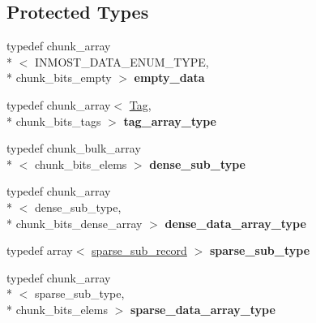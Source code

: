 \subsection*{Protected Types}
\begin{DoxyCompactItemize}
\item 
\hypertarget{classINMOST_1_1TagManager_a6c89e8450f65055147301406d7f9c437}{typedef chunk\-\_\-array\\*
$<$ I\-N\-M\-O\-S\-T\-\_\-\-D\-A\-T\-A\-\_\-\-E\-N\-U\-M\-\_\-\-T\-Y\-P\-E, \\*
chunk\-\_\-bits\-\_\-empty $>$ {\bfseries empty\-\_\-data}}\label{classINMOST_1_1TagManager_a6c89e8450f65055147301406d7f9c437}

\item 
\hypertarget{classINMOST_1_1TagManager_ab7915f5a3e87fe36e14e9766d1437369}{typedef chunk\-\_\-array$<$ \hyperlink{classINMOST_1_1Tag}{Tag}, \\*
chunk\-\_\-bits\-\_\-tags $>$ {\bfseries tag\-\_\-array\-\_\-type}}\label{classINMOST_1_1TagManager_ab7915f5a3e87fe36e14e9766d1437369}

\item 
\hypertarget{classINMOST_1_1TagManager_acc5a035bf2ee39c0fb8417b0b290a26b}{typedef chunk\-\_\-bulk\-\_\-array\\*
$<$ chunk\-\_\-bits\-\_\-elems $>$ {\bfseries dense\-\_\-sub\-\_\-type}}\label{classINMOST_1_1TagManager_acc5a035bf2ee39c0fb8417b0b290a26b}

\item 
\hypertarget{classINMOST_1_1TagManager_ac573af6facd80a651b3496938235130e}{typedef chunk\-\_\-array\\*
$<$ dense\-\_\-sub\-\_\-type, \\*
chunk\-\_\-bits\-\_\-dense\-\_\-array $>$ {\bfseries dense\-\_\-data\-\_\-array\-\_\-type}}\label{classINMOST_1_1TagManager_ac573af6facd80a651b3496938235130e}

\item 
\hypertarget{classINMOST_1_1TagManager_a580e8cfe488c581a007d7108a27d5718}{typedef array$<$ \hyperlink{structINMOST_1_1TagManager_1_1sparse__sub__record}{sparse\-\_\-sub\-\_\-record} $>$ {\bfseries sparse\-\_\-sub\-\_\-type}}\label{classINMOST_1_1TagManager_a580e8cfe488c581a007d7108a27d5718}

\item 
\hypertarget{classINMOST_1_1TagManager_a36d8c18c51b82ff914061a3a13b16444}{typedef chunk\-\_\-array\\*
$<$ sparse\-\_\-sub\-\_\-type, \\*
chunk\-\_\-bits\-\_\-elems $>$ {\bfseries sparse\-\_\-data\-\_\-array\-\_\-type}}\label{classINMOST_1_1TagManager_a36d8c18c51b82ff914061a3a13b16444}


\end{DoxyCompactItemize}
